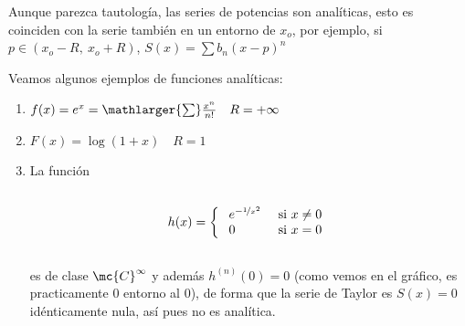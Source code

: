 \begin{obs}
    Aunque parezca tautología, las series de potencias son analíticas, esto es coinciden con la serie también en un entorno de $x_o$, por ejemplo, si $p \in (x_o-R, \: x_o+R)$, $S(x)=\sum b_n(x-p)^n$
\end{obs}
\begin{ejes}
Veamos algunos ejemplos de funciones analíticas:
\begin{enumerate}
    \item $f(x)=e^x=\mathlarger{\sum} \frac{x^n}{n!} \quad R=+\infty$
    \item $F(x)=\log(1+x) \quad R=1$
    \item La función \vspace{-20mm}
    \begin{multicols}{3}[\columnsep=5mm]
    \subsection*{}
    $$h(x)=\left\{\begin{array}{ll}
    \; e^{-\nicefrac{1}{x^2}} & \text{ si } x \neq 0 \\ \; 0 & \text{ si } x =0
    \end{array}\right.$$ \columnbreak
    \subsection*{}
    \subsection*{}
    \end{multicols}
    es de clase $\mc{C}^{\infty}$ y además $h^{(n)}(0)=0$ (como vemos en el gráfico, es practicamente 0 entorno al 0), de forma que la serie de Taylor es $S(x)=0$ idénticamente nula, así pues no es analítica.
\end{enumerate}
\end{ejes}
